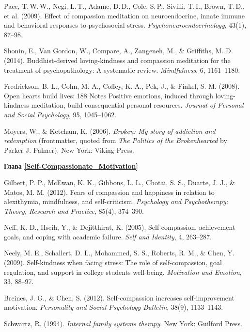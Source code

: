 \begin{thebibliography}{999}
	 Pace, T.\,W.\,W., Negi, L.\,T., Adame, D.\,D., Cole, S.\,P., Sivilli, T.\,I., Brown, T.\,D., et al. (2009). Effect of compassion meditation on neuroendocrine, innate immune and behavioral responses to psychosocial stress. \textit{Psychoneuroendocrinology}, 43(1), 87–98.
	
	 Shonin, E., Van Gordon, W., Compare, A., Zangeneh, M., \& Griffiths, M. D. (2014). Buddhist-derived loving-kindness and compassion meditation for the treatment of psychopathology: A systematic review. \textit{Mindfulness}, 6, 1161–1180.
	
	 Fredrickson, B. L., Cohn, M. A., Coffey, K. A., Pek, J., \& Finkel, S. M. (2008). Open hearts build lives: 188 Notes Positive emotions, induced through loving-kindness meditation, build consequential personal resources. \textit{Journal of Personal and Social Psychology}, 95, 1045–1062.
	
	 Moyers, W., \& Ketcham, K. (2006). \textit{Broken: My story of addiction and redemption} (frontmatter, quoted from \textit{The Politics of the Brokenhearted} by Parker J. Palmer). New York: Viking Press.
	
	
	\vspace{3ex}
	\textbf{Глава \ref{Self-Compassionate_Motivation}}
	
	 Gilbert, P. P., McEwan, K. K., Gibbons, L. L., Chotai, S. S., Duarte, J. J., \& Matos, M. M. (2012). Fears of compassion and happiness in relation to alexithymia, mindfulness, and self-criticism. \textit{Psychology and Psychotherapy: Theory, Research and Practice}, 85(4), 374–390.
	
	 Neff, K. D., Hseih, Y., \& Dejitthirat, K. (2005). Self-compassion, achievement goals, and coping with academic failure. \textit{Self and Identity}, 4, 263–287.
	
	 Neely, M. E., Schallert, D. L., Mohammed, S. S., Roberts, R. M., \& Chen, Y. (2009). Self-kindness when facing stress: The role of self-compassion, goal regulation, and support in college students well-being. \textit{Motivation and Emotion}, 33, 88–97.
	
	 Breines, J. G., \& Chen, S. (2012). Self-compassion increases self-improvement motivation. \textit{Personality and Social Psychology Bulletin}, 38(9), 1133–1143.
	
	 Schwartz, R. (1994). \textit{Internal family systems therapy}. New York: Guilford Press.
	

\end{thebibliography}
